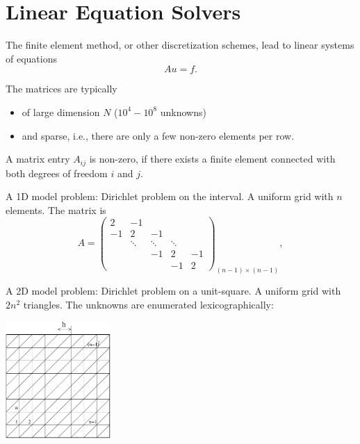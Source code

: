 \chapter{Linear Equation Solvers}

The finite element method, or other discretization schemes, lead to
linear systems of equations
$$
A u = f. 
$$

The matrices are typically
\begin{itemize}
\item of large dimension $N$ ($10^4 - 10^8$ unknowns)
\item and sparse, i.e., there are only a few non-zero elements per row.
\end{itemize}

A matrix entry $A_{ij}$ is non-zero, if there exists a finite element connected
with both degrees of freedom $i$ and $j$.

A 1D model problem: Dirichlet problem on the interval. A uniform grid with
$n$ elements. The matrix is
$$
A = \left( \begin{array} {ccccc}
        2 & -1  \\
        -1 & 2 & -1 \\
         & \ddots & \ddots & \ddots \\
        & & -1 & 2 & -1 \\
        & & & -1 & 2 
        \end{array}
        \right)_{(n-1) \times (n-1)},
$$


A 2D model problem: Dirichlet problem on a unit-square. A uniform grid with $2 n^2$ triangles. The unknowns are enumerated lexicographically:
\begin{center}
\includegraphics[width=4cm]{pictures/uniform_grid}
\end{center}

